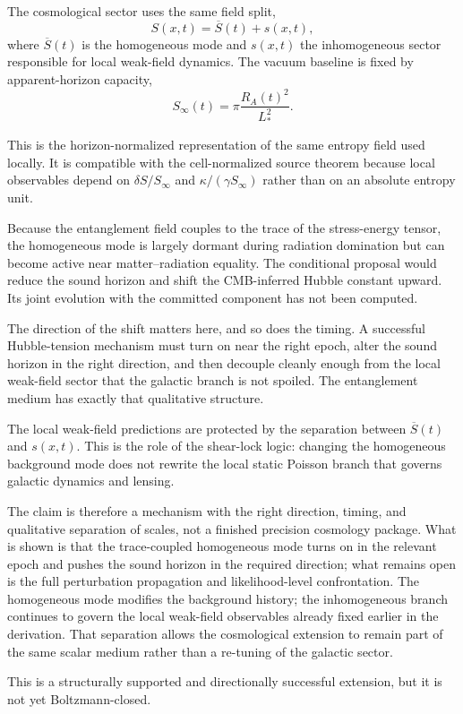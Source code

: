 \documentclass[11pt]{article}
\begin{document}
The cosmological sector uses the same field split,
\[
S(x,t)=\overline S(t)+s(x,t),
\]
where $\overline S(t)$ is the homogeneous mode and $s(x,t)$ the inhomogeneous sector responsible for local weak-field dynamics. The vacuum baseline is fixed by apparent-horizon capacity,
\[
S_\infty(t)=\pi\frac{R_A(t)^2}{L_*^2}.
\]

This is the horizon-normalized representation of the same entropy field used locally. It is compatible with the cell-normalized source theorem because local observables depend on $\delta S/S_\infty$ and $\kappa/(\gamma S_\infty)$ rather than on an absolute entropy unit.

Because the entanglement field couples to the trace of the stress-energy tensor, the homogeneous mode is largely dormant during radiation domination but can become active near matter--radiation equality. The conditional proposal would reduce the sound horizon and shift the CMB-inferred Hubble constant upward. Its joint evolution with the committed component has not been computed.

The direction of the shift matters here, and so does the timing. A successful Hubble-tension mechanism must turn on near the right epoch, alter the sound horizon in the right direction, and then decouple cleanly enough from the local weak-field sector that the galactic branch is not spoiled. The entanglement medium has exactly that qualitative structure.

The local weak-field predictions are protected by the separation between $\overline S(t)$ and $s(x,t)$. This is the role of the shear-lock logic: changing the homogeneous background mode does not rewrite the local static Poisson branch that governs galactic dynamics and lensing.

The claim is therefore a mechanism with the right direction, timing, and qualitative separation of scales, not a finished precision cosmology package. What is shown is that the trace-coupled homogeneous mode turns on in the relevant epoch and pushes the sound horizon in the required direction; what remains open is the full perturbation propagation and likelihood-level confrontation. The homogeneous mode modifies the background history; the inhomogeneous branch continues to govern the local weak-field observables already fixed earlier in the derivation. That separation allows the cosmological extension to remain part of the same scalar medium rather than a re-tuning of the galactic sector.

This is a structurally supported and directionally successful extension, but it is not yet Boltzmann-closed.
\end{document}
